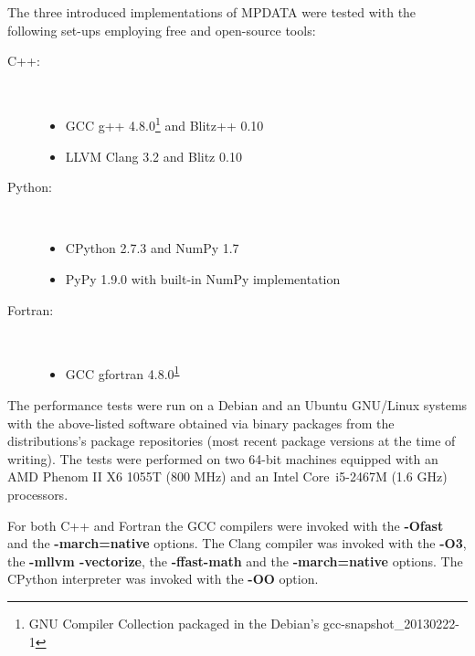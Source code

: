 \documentclass[final,5p,times,twocolumn]{elsarticle}
\newcommand{\prog}[1]{{\rm\bf#1}}
\begin{document}
  The three introduced implementations of MPDATA were tested with the following set-ups 
    employing free and open-source tools:
  \begin{description}
    \item[C++:]{~
      \begin{itemize}
        \item{GCC g++ 4.8.0\footnote{\label{fnt:gcc-snapshot}GNU Compiler Collection packaged in the Debian's gcc-snapshot\_20130222-1} 
          and Blitz++ 0.10}
        \item{LLVM Clang 3.2 and Blitz 0.10}
      \end{itemize}
    }
    \item[Python:]{~
      \begin{itemize}
        \item{CPython 2.7.3 and NumPy 1.7}
        \item{PyPy 1.9.0 with built-in NumPy implementation}
      \end{itemize}
    }
    \item[Fortran:]{~
      \begin{itemize}
        \item{GCC gfortran 4.8.0\textsuperscript{\ref{fnt:gcc-snapshot}}}
      \end{itemize}
    }
  \end{description}
  The performance tests were run on a Debian and an Ubuntu GNU/Linux systems with the above-listed software obtained 
    via binary packages from the distributions's package repositories (most recent package versions at the time of writing).
  The tests were performed on two 64-bit machines equipped with
    an AMD Phenom\textsuperscript{\texttrademark} II X6 1055T (800 MHz)
    and an Intel\textsuperscript{\textregistered} Core\textsuperscript{\texttrademark}~i5-2467M (1.6 GHz)
    processors.

  For both C++ and Fortran the GCC compilers were invoked with the \prog{-Ofast} and the 
    \prog{-march=native} options.
  The Clang compiler was invoked with the \prog{-O3}, the \prog{-mllvm -vectorize}, the \prog{-ffast-math} 
    and the \prog{-march=native} options.
  The CPython interpreter was invoked with the \prog{-OO} option.
\end{document}
